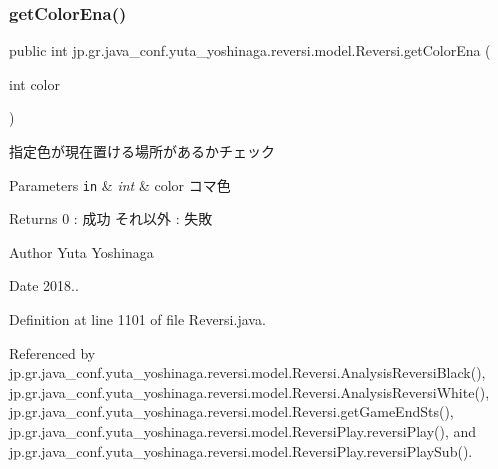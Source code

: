 \subsubsection{\texorpdfstring{get\+Color\+Ena()}{getColorEna()}}
{\footnotesize\ttfamily public int jp.\+gr.\+java\+\_\+conf.\+yuta\+\_\+yoshinaga.\+reversi.\+model.\+Reversi.\+get\+Color\+Ena (\begin{DoxyParamCaption}\item[{int}]{color }\end{DoxyParamCaption})}



指定色が現在置ける場所があるかチェック 


\begin{DoxyParams}[1]{Parameters}
\mbox{\tt in}  & {\em int} & color コマ色 \\
\hline
\end{DoxyParams}
\begin{DoxyReturn}{Returns}
0 \+: 成功 それ以外 \+: 失敗 
\end{DoxyReturn}
\begin{DoxyAuthor}{Author}
Yuta Yoshinaga 
\end{DoxyAuthor}
\begin{DoxyDate}{Date}
2018.. 
\end{DoxyDate}


Definition at line 1101 of file Reversi.\+java.



Referenced by jp.\+gr.\+java\+\_\+conf.\+yuta\+\_\+yoshinaga.\+reversi.\+model.\+Reversi.\+Analysis\+Reversi\+Black(), jp.\+gr.\+java\+\_\+conf.\+yuta\+\_\+yoshinaga.\+reversi.\+model.\+Reversi.\+Analysis\+Reversi\+White(), jp.\+gr.\+java\+\_\+conf.\+yuta\+\_\+yoshinaga.\+reversi.\+model.\+Reversi.\+get\+Game\+End\+Sts(), jp.\+gr.\+java\+\_\+conf.\+yuta\+\_\+yoshinaga.\+reversi.\+model.\+Reversi\+Play.\+reversi\+Play(), and jp.\+gr.\+java\+\_\+conf.\+yuta\+\_\+yoshinaga.\+reversi.\+model.\+Reversi\+Play.\+reversi\+Play\+Sub().

